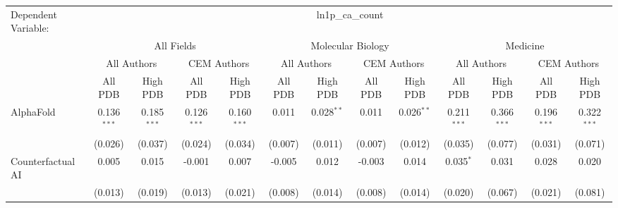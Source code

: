 \begingroup
\centering
\begin{tabular}{lcccccccccccc}
   \tabularnewline \midrule \midrule
   Dependent Variable: & \multicolumn{12}{c}{ln1p\_ca\_count}\\
 & \multicolumn{4}{c}{All Fields} & \multicolumn{4}{c}{Molecular Biology} & \multicolumn{4}{c}{Medicine} \\
\cmidrule(lr){2-5} \cmidrule(lr){6-9} \cmidrule(lr){10-13}
 & \multicolumn{2}{c}{All Authors} & \multicolumn{2}{c}{CEM Authors} & \multicolumn{2}{c}{All Authors} & \multicolumn{2}{c}{CEM Authors} & \multicolumn{2}{c}{All Authors} & \multicolumn{2}{c}{CEM Authors} \\
\cmidrule(lr){2-3} \cmidrule(lr){4-5} \cmidrule(lr){6-7} \cmidrule(lr){8-9} \cmidrule(lr){10-11} \cmidrule(lr){12-13}
 & \multicolumn{1}{c}{All PDB} & \multicolumn{1}{c}{High PDB} & \multicolumn{1}{c}{All PDB} & \multicolumn{1}{c}{High PDB} & \multicolumn{1}{c}{All PDB} & \multicolumn{1}{c}{High PDB} & \multicolumn{1}{c}{All PDB} & \multicolumn{1}{c}{High PDB} & \multicolumn{1}{c}{All PDB} & \multicolumn{1}{c}{High PDB} & \multicolumn{1}{c}{All PDB} & \multicolumn{1}{c}{High PDB} \\
\cmidrule(lr){2-2} \cmidrule(lr){3-3} \cmidrule(lr){4-4} \cmidrule(lr){5-5} \cmidrule(lr){6-6} \cmidrule(lr){7-7} \cmidrule(lr){8-8} \cmidrule(lr){9-9} \cmidrule(lr){10-10} \cmidrule(lr){11-11} \cmidrule(lr){12-12} \cmidrule(lr){13-13}
   AlphaFold                                                  & 0.136$^{***}$ & 0.185$^{***}$  & 0.126$^{***}$ & 0.160$^{***}$  & 0.011         & 0.028$^{**}$   & 0.011         & 0.026$^{**}$   & 0.211$^{***}$  & 0.366$^{***}$  & 0.196$^{***}$ & 0.322$^{***}$\\   
                                                              & (0.026)       & (0.037)        & (0.024)       & (0.034)        & (0.007)       & (0.011)        & (0.007)       & (0.012)        & (0.035)        & (0.077)        & (0.031)       & (0.071)\\   
   Counterfactual AI                                          & 0.005         & 0.015          & -0.001        & 0.007          & -0.005        & 0.012          & -0.003        & 0.014          & 0.035$^{*}$    & 0.031          & 0.028         & 0.020\\   
                                                              & (0.013)       & (0.019)        & (0.013)       & (0.021)        & (0.008)       & (0.014)        & (0.008)       & (0.014)        & (0.020)        & (0.067)        & (0.021)       & (0.081)\\   

\end{tabular}
